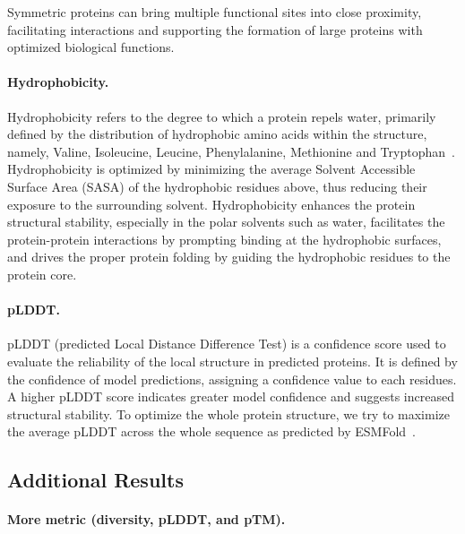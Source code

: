 Symmetric proteins can bring multiple functional sites into close proximity, facilitating interactions and supporting the formation of large proteins with optimized biological functions.  


\paragraph{Hydrophobicity.} 
Hydrophobicity refers to the degree to which a protein repels water, primarily defined by the distribution of hydrophobic amino acids within the structure, namely, Valine, Isoleucine, Leucine, Phenylalanine, Methionine and Tryptophan~\citep{chandler2002hydrophobicity}. Hydrophobicity is optimized by minimizing the average Solvent Accessible Surface Area (SASA) of the hydrophobic residues above, thus reducing their exposure to the surrounding solvent. Hydrophobicity enhances the protein structural stability, especially in the polar solvents such as water, facilitates the protein-protein interactions by prompting binding at the hydrophobic surfaces, and drives the proper protein folding by guiding the hydrophobic residues to the protein core.

\paragraph{pLDDT.}
pLDDT (predicted Local Distance Difference Test) is a confidence score used to evaluate the reliability of the local structure in predicted proteins. It is defined by the confidence of model predictions, assigning a confidence value to each residues. A higher pLDDT score indicates greater model confidence and suggests increased structural stability. To optimize the whole protein structure, we try to maximize the average pLDDT across the whole sequence as predicted by ESMFold~\citep{lin2023evolutionary}.




\subsection{Additional Results} 

\paragraph{More metric (diversity, pLDDT, and pTM).}

